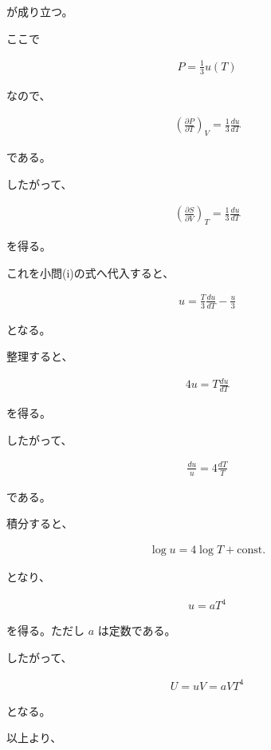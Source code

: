 \documentclass[platex,dvipdfmx,a4paper]{jsarticle}
\begin{document}
が成り立つ。

ここで

\begin{align*}
P=\frac13u(T)
\end{align*}

なので、

\begin{align*}
\left(
\frac{\partial P}{\partial T}
\right)_V
=
\frac13
\frac{du}{dT}
\end{align*}

である。

したがって、

\begin{align*}
\left(
\frac{\partial S}{\partial V}
\right)_T
=
\frac13
\frac{du}{dT}
\end{align*}

を得る。

これを小問(i)の式へ代入すると、

\begin{align*}
u
=
\frac{T}{3}
\frac{du}{dT}
-\frac{u}{3}
\end{align*}

となる。

整理すると、

\begin{align*}
4u
=
T
\frac{du}{dT}
\end{align*}

を得る。

したがって、

\begin{align*}
\frac{du}{u}
=
4
\frac{dT}{T}
\end{align*}

である。

積分すると、

\begin{align*}
\log u
=
4\log T+\mathrm{const.}
\end{align*}

となり、

\begin{align*}
u=aT^4
\end{align*}

を得る。ただし $a$ は定数である。

したがって、

\begin{align*}
U=uV
=
aVT^4
\end{align*}

となる。

以上より、
\end{document}
